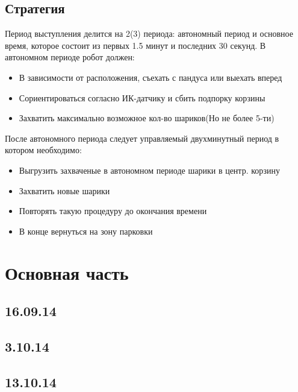 \documentclass[11pt]{article}
\begin{document}
		\subsection{Стратегия}
			Период выступления делится на 2(3) периода: автономный период и основное время, которое состоит из первых 1.5 минут и последних 30 секунд.
			В автономном периоде робот должен:
			\begin{itemize}
				\item В зависимости от расположения, съехать с пандуса или выехать вперед
				\item Сориентироваться согласно ИК-датчику и сбить подпорку корзины
				\item Захватить максимально возможное кол-во шариков(Но не более 5-ти)
			\end{itemize}
			После автономного периода следует управляемый двухминутный период в котором необходимо:
			\begin{itemize}
				\item Выгрузить захваченые в автономном периоде шарики в центр. корзину
				\item Захватить новые шарики 
				\item Повторять такую процедуру до окончания времени
				\item В конце вернуться на зону парковки
			\end{itemize}
		
	\section{Основная часть}
	
	\subsection{16.09.14}

	\subsection{3.10.14}

	
	\subsection{13.10.14}
	
	
\end{document}
